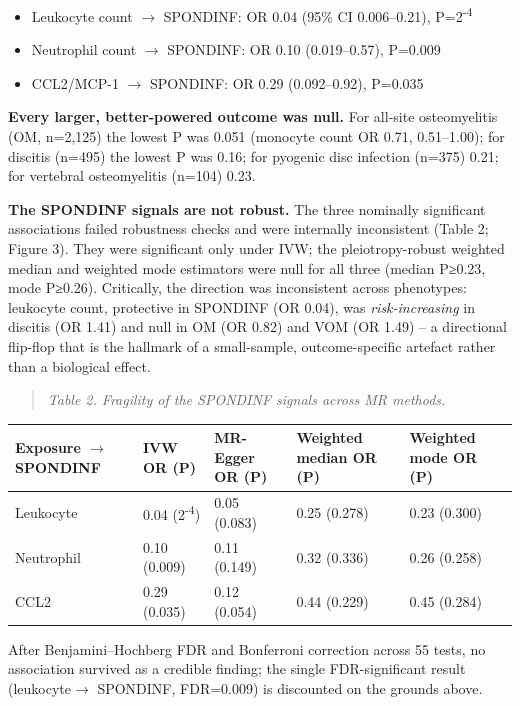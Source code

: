 \documentclass[11pt]{article}
\begin{document}
\begin{itemize}
\item Leukocyte count $\rightarrow$  SPONDINF: OR 0.04 (95\% CI 0.006--0.21), P=2\textsuperscript{-4}
\item Neutrophil count $\rightarrow$  SPONDINF: OR 0.10 (0.019--0.57), P=0.009
\item CCL2/MCP-1 $\rightarrow$  SPONDINF: OR 0.29 (0.092--0.92), P=0.035
\end{itemize}
\textbf{Every larger, better-powered outcome was null.} For all-site osteomyelitis (OM, n=2,125) the lowest P was 0.051 (monocyte count OR 0.71, 0.51--1.00); for discitis (n=495) the lowest P was 0.16; for pyogenic disc infection (n=375) 0.21; for vertebral osteomyelitis (n=104) 0.23.

\textbf{The SPONDINF signals are not robust.} The three nominally significant associations failed robustness checks and were internally inconsistent (Table 2; Figure 3). They were significant only under IVW; the pleiotropy-robust weighted median and weighted mode estimators were null for all three (median P≥0.23, mode P≥0.26). Critically, the direction was inconsistent across phenotypes: leukocyte count, protective in SPONDINF (OR 0.04), was \emph{risk-increasing} in discitis (OR 1.41) and null in OM (OR 0.82) and VOM (OR 1.49) -- a directional flip-flop that is the hallmark of a small-sample, outcome-specific artefact rather than a biological effect.

\begin{quote}\emph{Table 2. Fragility of the SPONDINF signals across MR methods.}\end{quote}
\begin{table}[ht]\centering
\begin{tabular}{lllll}
\toprule
Exposure $\rightarrow$  SPONDINF & IVW OR (P) & MR-Egger OR (P) & Weighted median OR (P) & Weighted mode OR (P) \\
\midrule
Leukocyte & 0.04 (2\times 10\textsuperscript{-4}) & 0.05 (0.083) & 0.25 (0.278) & 0.23 (0.300) \\
Neutrophil & 0.10 (0.009) & 0.11 (0.149) & 0.32 (0.336) & 0.26 (0.258) \\
CCL2 & 0.29 (0.035) & 0.12 (0.054) & 0.44 (0.229) & 0.45 (0.284) \\
\bottomrule
\end{tabular}
\end{table}
After Benjamini--Hochberg FDR and Bonferroni correction across 55 tests, no association survived as a credible finding; the single FDR-significant result (leukocyte$\rightarrow$ SPONDINF, FDR=0.009) is discounted on the grounds above.
\end{document}

